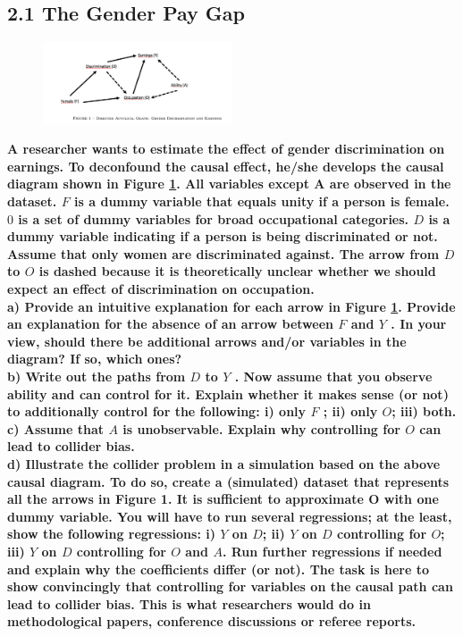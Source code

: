 \documentclass[a4paper,12pt,oneside,English]{article}
\begin{document}
\subsection{2.1 The Gender Pay Gap}
\begin{figure}[h!]
    \centering
    \includegraphics[width=0.5\textwidth]{Image 1.png}
    \caption{}
    \label{fig 1}
\end{figure}
\textbf{A researcher wants to estimate the effect of gender discrimination on earnings. To deconfound the causal effect, he/she develops the causal diagram shown in Figure \ref{fig 1}. All variables except A are observed in the dataset. $F$ is a dummy variable that equals unity if a person is female. $0$ is a set of dummy variables for broad occupational categories. $D$ is a dummy variable indicating if a person is being discriminated or not. Assume that only women are discriminated against. The arrow from $D$ to $O$ is dashed because it is theoretically unclear whether we should expect an effect of discrimination on occupation.}\\
\textbf{a) Provide an intuitive explanation for each arrow in Figure \ref{fig 1}. Provide an explanation for the absence of an arrow between $F$ and $Y$ . In your view, should there be additional arrows and/or variables in the diagram? If so, which ones?}\\
\textbf{b) Write out the paths from $D$ to $Y$ . Now assume that you observe ability and can control for it. Explain whether it makes sense (or not) to additionally control for the following: i) only $F$ ; ii) only $O$; iii) both.}\\
\textbf{c) Assume that $A$ is unobservable. Explain why controlling for $O$ can lead to collider bias.}\\
\textbf{d) Illustrate the collider problem in a simulation based on the above causal diagram. To do so, create a (simulated) dataset that represents all the arrows in Figure 1. It is sufficient to approximate O with one dummy variable. You will have to run several regressions; at the least, show the following regressions: i) $Y$ on $D$; ii) $Y$ on $D$ controlling for $O$; iii) $Y$ on $D$ controlling for $O$ and $A$. Run further regressions if needed and explain why the coefficients differ (or not). The task is here to show convincingly that controlling for variables on the causal path can lead to collider bias. This is what researchers would do in methodological papers, conference discussions or referee reports.}\\
\newpage
\end{document}
